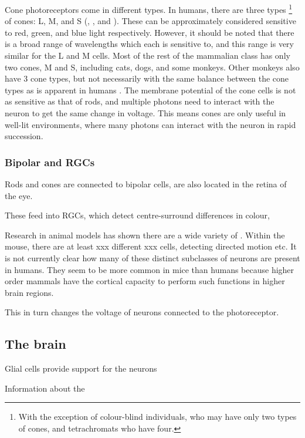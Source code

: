Cone photoreceptors come in different types.
In humans, there are three types%
\footnote{With the exception of colour-blind individuals, who may have only two types of cones, and tetrachromats \citep{Nagy1981,Jordan1993,Jameson2001} who have four.}
of cones:
\acl{L}, \acl{M}, and \acl{S} (, , and ).
These can be approximately considered sensitive to red, green, and blue light respectively.
However, it should be noted that there is a broad range of wavelengths which each is sensitive to, and this range is very similar for the \ac{L} and \ac{M} cells.
Most of the rest of the mammalian class has only two cones, \ac{M} and \ac{S}, including cats, dogs, and some monkeys.
Other monkeys also have 3 cone types, but not necessarily with the same balance between the cone types as is apparent in humans \citep{Stockman2008}.
The membrane potential of the cone cells is not as sensitive as that of rods, and multiple photons need to interact with the neuron to get the same change in voltage.
This means cones are only useful in well-lit environments, where many photons can interact with the neuron in rapid succession.


\subsubsection{Bipolar and \aclp{RGC}}

Rods and cones are connected to bipolar cells, are also located in the retina of the eye.

These feed into \acp{RGC}, which detect centre-surround differences in colour, 

Research in animal models has shown there are a wide variety of .
Within the mouse, there are at least xxx different xxx cells, detecting directed motion etc.
It is not currently clear how many of these distinct subclasses of neurons are present in humans.
They seem to be more common in mice than humans because higher order mammals have the cortical capacity to perform such functions in higher brain regions.

This in turn changes the voltage of neurons connected to the photoreceptor.


\subsection{The brain}

Glial cells provide support for the neurons

Information about the 

